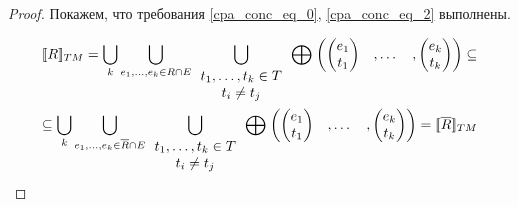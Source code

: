 
\begin{proof}
Покажем, что требования \ref{cpa_conc_eq_0}, \ref{cpa_conc_eq_2} выполнены.

\begin{align}
[\![ R ]\!]_{TM} = \bigcup_{k}{\bigcup_{
e_1,\dots,e_k \in R \cap E}{ 
\bigcup_{
\begin{array}{c}
t_1,\dots,t_k \in T \\
t_i \neq t_j
\end{array}
} {
\mathrel{\bigoplus}
\begin{pmatrix}
\begin{pmatrix}
e_1 \\
t_1 
\end{pmatrix}&,
\dots& ,
\begin{pmatrix}
e_k \\
t_k 
\end{pmatrix}
\end{pmatrix} 
}
}
} \subseteq \nonumber \\
\subseteq \bigcup_{k}{\bigcup_{
e_1,\dots,e_k \in \overline{R} \cap E}{
\bigcup_{
\begin{array}{c}
t_1,\dots,t_k \in T \\
t_i \neq t_j
\end{array}
} {
\mathrel{\bigoplus}
\begin{pmatrix}
\begin{pmatrix}
e_1 \\
t_1 
\end{pmatrix}&,
\dots& ,
\begin{pmatrix}
e_k \\
t_k 
\end{pmatrix}
\end{pmatrix} 
}
}
} = [\![ \overline{R} ]\!]_{TM} \nonumber
\end{align}


\end{proof}
